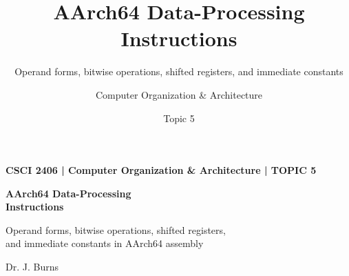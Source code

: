 \documentclass[aspectratio=169,11pt,t]{beamer}
\title[Topic 5]{AArch64 Data-Processing Instructions}
\subtitle{Operand forms, bitwise operations, shifted registers, and immediate constants}
\author{Computer Organization \& Architecture}
\date{Topic 5}
\begin{document}



\begin{frame}[plain]

\vspace*{\fill}

\begin{minipage}{0.88\textwidth}
{\color{gold}\normalsize\bfseries
CSCI 2406 \;|\; Computer Organization \& Architecture \;|\; TOPIC 5
\par}

\vspace{0.25cm}

{\color{white}\fontsize{24}{28}\selectfont\bfseries
AArch64 Data-Processing\\[0.08cm]Instructions
\par}

\vspace{0.35cm}

{\color{white!80}\large
Operand forms, bitwise operations, shifted registers,\\and immediate constants in AArch64 assembly
\par}
\end{minipage}

\vfill

{\color{white!70}\small
Dr. J. Burns
\par}

\vspace*{\fill}
\end{frame}



\end{document}
